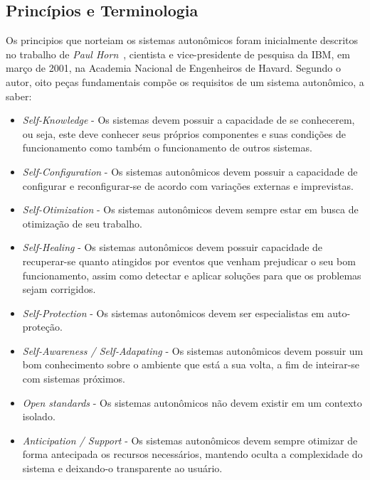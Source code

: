 \documentclass[11pt,twoside]{article}
\begin{document}
\subsection{Princípios e Terminologia}
Os principios que norteiam os sistemas autonômicos foram inicialmente descritos no trabalho de \textit{Paul Horn}~\cite{KEPHART}, cientista e vice-presidente de pesquisa da IBM, em março de 2001, na Academia Nacional de Engenheiros de Havard. Segundo o autor, oito peças fundamentais compõe os requisitos de um sistema autonômico, a saber:

\begin{itemize}
\item \textit{Self-Knowledge} - Os sistemas devem possuir a capacidade de se conhecerem, ou seja, este deve conhecer seus próprios componentes e suas condições de funcionamento como também o funcionamento de outros sistemas. 
\item \textit{Self-Configuration} - Os sistemas autonômicos devem possuir a capacidade de configurar e reconfigurar-se de acordo com variações externas e imprevistas.
\item \textit{Self-Otimization} - Os sistemas autonômicos devem sempre estar em busca de otimização de seu trabalho.
\item \textit{Self-Healing} - Os sistemas autonômicos devem possuir capacidade de recuperar-se quanto atingidos por eventos que venham prejudicar o seu bom funcionamento, assim como detectar e aplicar soluções para que os problemas sejam corrigidos.
\item \textit{Self-Protection} - Os sistemas autonômicos devem ser especialistas em auto-proteção.
\item \textit{Self-Awareness / Self-Adapating} - Os sistemas autonômicos devem possuir um bom conhecimento sobre o ambiente que está a sua volta, a fim de inteirar-se com sistemas próximos.
\item \textit{Open standards} - Os sistemas autonômicos não devem existir em um contexto isolado.
\item \textit{Anticipation / Support} - Os sistemas autonômicos devem sempre otimizar de forma antecipada os recursos necessários, mantendo oculta a complexidade do sistema e deixando-o transparente ao usuário.
\end{itemize}
\end{document}
